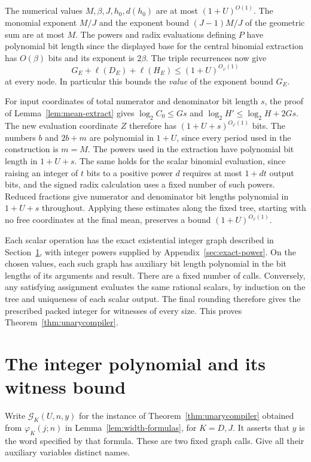 \documentclass[11pt,letterpaper]{article}
\numberwithin{equation}{section}
\begin{document}
The numerical values $M,\beta,J,h_0,d(h_0)$ are at most $(1+U)^{O(1)}$. The monomial exponent $M/J$ and the exponent bound $(J-1)M/J$ of the geometric sum are at most $M$. The powers and radix evaluations defining $P$ have polynomial bit length since the displayed base for the central binomial extraction has $O(\beta)$ bits and its exponent is $2\beta$. The triple recurrences now give
\[
              G_E+\ell(D_E)+\ell(H_E)\le(1+U)^{O_\varphi(1)}
\]
at every node. In particular this bounds the \emph{value} of the exponent bound $G_E$.

For input coordinates of total numerator and denominator bit length $s$, the proof of Lemma~\ref{lem:mean-extract} gives $\log_2 C_0\le Gs$ and $\log_2 H'\le\log_2 H+2Gs$. The new evaluation coordinate $Z$ therefore has $(1+U+s)^{O_\varphi(1)}$ bits. The numbers $b$ and $2b+m$ are polynomial in $1+U$, since every period used in the construction is $m=M$. The powers used in the extraction have polynomial bit length in $1+U+s$. The same holds for the scalar binomial evaluation, since raising an integer of $t$ bits to a positive power $d$ requires at most $1+dt$ output bits, and the signed radix calculation uses a fixed number of such powers. Reduced fractions give numerator and denominator bit lengths polynomial in $1+U+s$ throughout. Applying these estimates along the fixed tree, starting with no free coordinates at the final mean, preserves a bound $(1+U)^{O_\varphi(1)}$.

Each scalar operation has the exact existential integer graph described in Section~\ref{sec:arithmetic}, with integer powers supplied by Appendix~\ref{sec:exact-power}. On the chosen values, each such graph has auxiliary bit length polynomial in the bit lengths of its arguments and result. There are a fixed number of calls. Conversely, any satisfying assignment evaluates the same rational scalars, by induction on the tree and uniqueness of each scalar output. The final rounding therefore gives the prescribed packed integer for witnesses of every size. This proves Theorem~\ref{thm:unarycompiler}.

\section{The integer polynomial and its witness bound}\label{sec:arithmetic}
Write $\mathcal G_K(U,n,y)$ for the instance of Theorem~\ref{thm:unarycompiler} obtained from $\varphi_K(j;n)$ in Lemma~\ref{lem:width-formulas}, for $K=D,J$. It asserts that $y$ is the word specified by that formula. These are two fixed graph calls. Give all their auxiliary variables distinct names.
\end{document}
